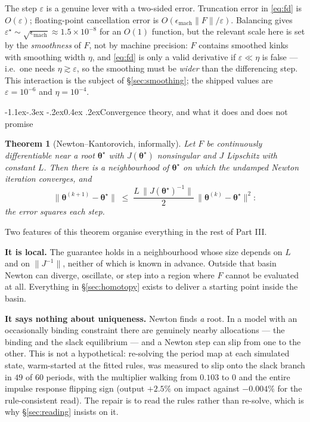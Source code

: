 \documentclass[10pt,a4paper]{article}
\makeatletter
\theoremstyle{definition}
\theoremstyle{plain}
\newtheorem{thm}[defn]{Theorem}
\theoremstyle{remark}
\newcommand{\pol}{\bm{\theta}}
\renewcommand\subsection{\@startsection{subsection}{2}{\z@}%
  {-1.1ex\@plus -.3ex \@minus -.2ex}{0.4ex \@plus .2ex}{\normalfont\normalsize\bfseries}}
\makeatother
\begin{document}
The step $\varepsilon$ is a genuine lever with a two-sided error. Truncation error in
\eqref{eq:fd} is $O(\varepsilon)$; floating-point cancellation error is
$O(\epsilon_{\mathrm{mach}}\|F\|/\varepsilon)$. Balancing gives
$\varepsilon^\star \sim \sqrt{\epsilon_{\mathrm{mach}}} \approx 1.5\times10^{-8}$ for an
$O(1)$ function, but the relevant scale here is set by the \emph{smoothness} of $F$, not by
machine precision: $F$ contains smoothed kinks with smoothing width $\eta$, and
\eqref{eq:fd} is only a valid derivative if $\varepsilon \ll \eta$ is false --- i.e.\ one
needs $\eta \gtrsim \varepsilon$, so the smoothing must be \emph{wider} than the
differencing step. This interaction is the subject of \S\ref{sec:smoothing}; the shipped
values are $\varepsilon = 10^{-6}$ and $\eta = 10^{-4}$.

\subsection{Convergence theory, and what it does and does not promise}

\begin{thm}[Newton--Kantorovich, informally]
Let $F$ be continuously differentiable near a root $\pol^\star$ with $J(\pol^\star)$
nonsingular and $J$ Lipschitz with constant $L$. Then there is a neighbourhood of
$\pol^\star$ on which the undamped Newton iteration converges, and
\begin{equation}
  \|\pol^{(k+1)} - \pol^\star\| \;\le\; \frac{L\,\|J(\pol^\star)^{-1}\|}{2}\,
  \|\pol^{(k)} - \pol^\star\|^{2}:
\end{equation}
the error \emph{squares} each step.
\end{thm}

Two features of this theorem organise everything in the rest of Part III.

\textbf{It is local.} The guarantee holds in a neighbourhood whose size depends on $L$ and
on $\|J^{-1}\|$, neither of which is known in advance. Outside that basin Newton can
diverge, oscillate, or step into a region where $F$ cannot be evaluated at all. Everything in
\S\ref{sec:homotopy} exists to deliver a starting point inside the basin.

\textbf{It says nothing about uniqueness.} Newton finds \emph{a} root. In a model with an
occasionally binding constraint there are genuinely nearby allocations --- the binding and the
slack equilibrium --- and a Newton step can slip from one to the other. This is not a
hypothetical: re-solving the period map at each simulated state, warm-started at the fitted
rules, was measured to slip onto the slack branch in $49$ of $60$ periods, with the
multiplier walking from $0.103$ to $0$ and the entire impulse response flipping sign (output
$+2.5\%$ on impact against $-0.004\%$ for the rule-consistent read). The repair is to read the
rules rather than re-solve, which is why \S\ref{sec:reading} insists on it.
\end{document}
